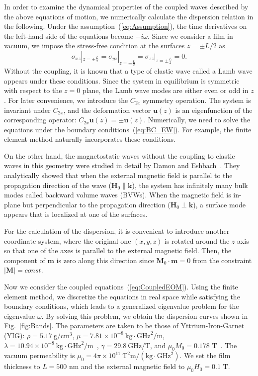 \documentclass[10pt]{iopart}
\begin{document}
In order to examine the dynamical properties of the coupled waves described by the above equations of motion, we numerically calculate the dispersion relation in the following. Under the assumption~(\ref{eq:Assumption}), the time derivatives on the left-hand side of the equations become $-i\omega$. Since we consider a film in vacuum, we impose the stress-free condition at the surfaces $z=\pm L/2$ as
\begin{equation}
    \sigma_{xz}|_{z=\pm\frac{L}{2}}=\sigma_{yz}|_{z=\pm\frac{L}{2}}=\sigma_{zz}|_{z=\pm\frac{L}{2}}=0.\label{eq:BC_EW}
\end{equation}
Without the coupling, it is known that a type of elastic wave called a Lamb wave appears under these conditions. Since the system in equilibrium is symmetric with respect to the $z=0$ plane, the Lamb wave modes are either even or odd in $z$. For later convenience, we introduce the $C_{2x}$ symmetry operation. The system is invariant under $C_{2x}$, and the deformation vector $\bm{u}(z)$ is an eigenfunction of the corresponding operator: $C_{2x}\bm{u}(z)=\pm\bm{u}(z)$. Numerically, we need to solve the equations under the boundary conditions~(\ref{eq:BC_EW}). For example, the finite element method naturally incorporates these conditions.

On the other hand, the magnetostatic waves without the coupling to elastic waves in this geometry were studied in detail by Damon and Eshbach~\cite{damoneshbachMagnetostaticModesFerromagnet1961}. They analytically showed that when the external magnetic field is parallel to the propagation direction of the wave ($\bm{H}_0\parallel\bm{k}$), the system has infinitely many bulk modes called backward volume waves (BVWs). When the magnetic field is in-plane but perpendicular to the propagation direction ($\bm{H}_0\perp\bm{k}$), a surface mode appears that is localized at one of the surfaces.

For the calculation of the dispersion, it is convenient to introduce another coordinate system, where the original one $(x,y,z)$ is rotated around the $z$ axis so that one of the axes is parallel to the external magnetic field. Then, the component of $\bm{m}$ is zero along this direction since $\bm{M}_0\cdot\bm{m}=0$ from the constraint $|\bm{M}|=const.$

Now we consider the coupled equations~(\ref{eq:CoupledEOM}). Using the finite element method, we discretize the equations in real space while satisfying the boundary conditions, which leads to a generalized eigenvalue problem for the eigenvalue $\omega$. By solving this problem, we obtain the dispersion curves shown in Fig.~\ref{fig:Bands}. The parameters are taken to be those of Yttrium-Iron-Garnet (YIG): $\rho=5.17\ \mathrm{g}/\mathrm{cm}^3$, $\mu=7.81\times10^{-8}\ \mathrm{kg}\cdot\mathrm{GHz}^2/\mathrm{m}$, $\lambda=10.94\times10^{-8}\ \mathrm{kg}\cdot\mathrm{GHz}^2/\mathrm{m}$~\cite{clarkElasticConstantsSingleCrystal1961}, $\gamma=29.8\ \mathrm{GHz}/\mathrm{T}$, and $\mu_0M_0=0.178$ T~\cite{AulockHandbookofferritematerials}. The vacuum permeability is $\mu_0=4\pi\times10^{11}\ \mathrm{T}^2\mathrm{m}/(\mathrm{kg}\cdot\mathrm{GHz}^2)$. We set the film thickness to $L=500$ nm and the external magnetic field to $\mu_0H_0=0.1$ T.
\end{document}

